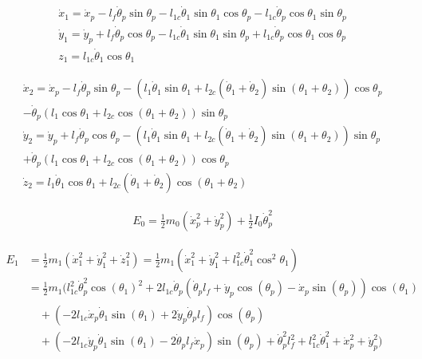 \documentclass{article}
\begin{document}
\begin{equation}
	\begin{aligned}
		\dot x_1 = \dot x_p - l_f \dot \theta_p \sin \theta_p - l_{1c} \dot \theta_1 \sin \theta_1 \cos \theta_p - l_{1c} \dot \theta_p \cos \theta_1 \sin \theta_p \\
		\dot y_1 = \dot y_p + l_f \dot \theta_p \cos \theta_p - l_{1c} \dot \theta_1 \sin \theta_1 \sin \theta_p + l_{1c} \dot \theta_p \cos \theta_1 \cos \theta_p \\
		z_1 = l_{1c} \dot \theta_1 \cos \theta_1
	\end{aligned}
\end{equation}

\begin{equation}
	\begin{aligned}
		\dot x_2 = \dot x_p - l_f \dot \theta_p \sin \theta_p - (l_{1} \dot \theta_1 \sin \theta_1+l_{2c} (\dot \theta_1 + \dot \theta_2) \sin (\theta_1 + \theta_2)) \cos \theta_p \\
		- \dot \theta_p(l_{1}  \cos \theta_1  + l_{2c}  \cos (\theta_1 + \theta_2)) \sin \theta_p \\
	   \dot y_2 = \dot y_p + l_f \dot \theta_p \cos \theta_p - (l_{1} \dot \theta_1 \sin \theta_1 + l_{2c} (\dot \theta_1 + \dot \theta_2) \sin (\theta_1 + \theta_2)) \sin \theta_p \\
		+ \dot \theta_p(l_{1}  \cos \theta_1  + l_{2c} \cos (\theta_1 + \theta_2)) \cos \theta_p \\
	   \dot z_2 = l_{1} \dot \theta_1 \cos \theta_1 + l_{2c} (\dot \theta_1 + \dot \theta_2) \cos (\theta_1 + \theta_2)
	\end{aligned}
\end{equation}

\begin{equation}
	\begin{aligned}
		E_0 = \frac{1}{2} m_0 (\dot x_p^2 + \dot y_p^2) + \frac{1}{2} I_0 \dot \theta_p^2	
	\end{aligned}
\end{equation}

\begin{equation}
	\begin{aligned}
		E_1 &= \frac{1}{2} m_1 (\dot x_1^2 + \dot y_1^2 + \dot z_1^2)=\frac{1}{2}m_1(\dot x_1^2 + \dot y_1^2 + l_{1c}^2 \dot \theta_1^2 \cos^2 \theta_1 ) \\
		&= \frac{1}{2} m_1 (l_{1c}^2 \dot \theta_p^2 \cos(\theta_1)^2 + 2 l_{1c} \dot \theta_p (\dot \theta_p l_f + \dot y_p \cos(\theta_p) - \dot x_p \sin(\theta_p)) \cos(\theta_1) \\
		&\quad  + (-2 l_{1c} \dot x_p \dot \theta_1 \sin(\theta_1) + 2 \dot y_p \dot \theta_p l_f) \cos(\theta_p) \\
		&\quad  + (-2 l_{1c} \dot y_p \dot \theta_1 \sin(\theta_1) - 2 \dot \theta_p l_f \dot x_p) \sin(\theta_p) + \dot \theta_p^2 l_f^2 + l_{1c}^2 \dot \theta_1^2 + \dot x_p^2 + \dot y_p^2)
	\end{aligned}
\end{equation}
\end{document}
